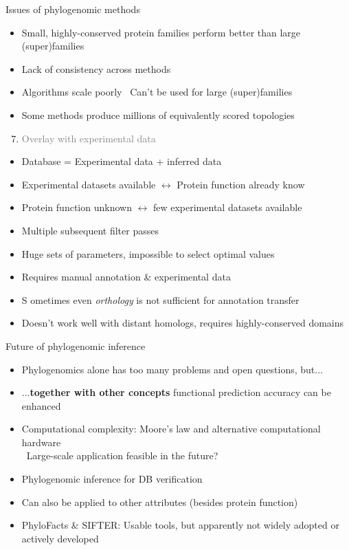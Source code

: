 \documentclass[14pt,xcolor=dvipsnames,pdftex]{beamer}
\begin{document}
\begin{frame}[allowframebreaks]{Issues of phylogenomic methods}
\begin{itemize}
  \item Small, highly-conserved protein families perform better than large (super)families
  \item Lack of consistency across methods
  \item Algorithms scale poorly
  \textrightarrow\ Can't be used for large (super)families
  \item Some methods produce millions of equivalently scored topologies
 \end{itemize}
 \framebreak
 \begin{enumerate}
  \setcounter{enumi}{6}
  \item \textcolor{gray}{Overlay with experimental data}
 \end{enumerate}
 \begin{itemize}
  \item Database = Experimental data + inferred data
  \item Experimental datasets available
        $\leftrightarrow$ Protein function already know
  \item Protein function unknown $\leftrightarrow$ few experimental datasets available
 \end{itemize}
 \framebreak
 \begin{itemize}
  \item Multiple subsequent filter passes
  \item Huge sets of parameters, impossible to select optimal values
  \item Requires manual annotation \& experimental data
  \item S	ometimes even \textit{orthology} is not sufficient for annotation transfer
  \item Doesn't work well with distant homologs, requires highly-conserved domains
  \end{itemize}
\end{frame}

\begin{frame}{Future of phylogenomic inference}
 \begin{itemize}
  \item Phylogenomics alone has too many problems and open questions, but...
  \pause
  \item ...\textbf{together with other concepts} functional prediction accuracy can be enhanced
  \item Computational complexity: Moore's law and alternative computational hardware\\
  \textrightarrow\ Large-scale application feasible in the future?
  \item Phylogenomic inference for DB verification
  \item Can also be applied to other attributes (besides protein function)
  \item PhyloFacts \& SIFTER: Usable tools, but apparently not widely adopted or actively developed
 \end{itemize}
\end{frame}
\end{document}
